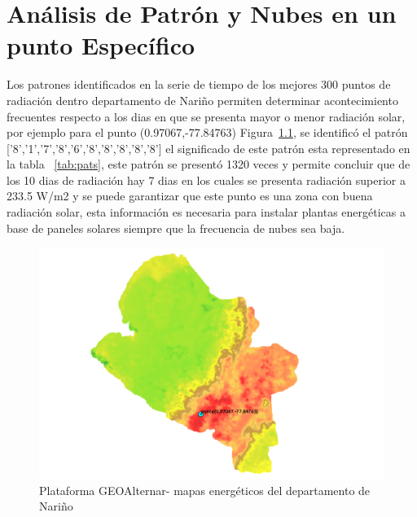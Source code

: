 \chapter{Análisis de Patrón y Nubes en un punto Específico}
Los patrones identificados en la serie de tiempo de los mejores 300 puntos de radiación dentro departamento de Nariño permiten determinar acontecimiento 
frecuentes respecto a los dias en que se presenta mayor o menor radiación solar, por ejemplo para el punto (0.97067,-77.84763) Figura~\ref{fig:pp}, se 
identificó el patrón ['8','1','7','8','6','8','8','8','8','8'] el significado de este patrón esta representado en la tabla ~\ref{tab:pats}, este patrón 
se presentó 1320 veces y permite concluir que de los 10 dias de radiación hay 7 dias en los cuales se presenta radiación superior a 233.5 W/m2 y se puede 
garantizar que este punto es una zona con buena radiación solar, esta información es necesaria para instalar plantas energéticas a base de paneles solares 
siempre que la frecuencia de nubes sea baja.
\begin{figure}[htbp]
  \centering 
  \includegraphics[scale=0.55]{pictures/pp.png}
  \caption{ Plataforma GEOAlternar- mapas energéticos del departamento de Nariño}
  \label{fig:pp}
\end{figure}

